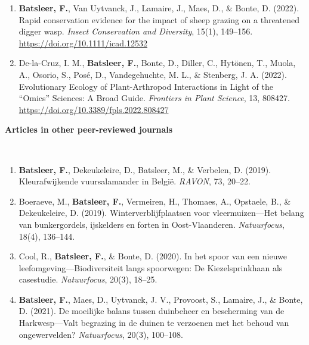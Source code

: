 \documentclass[10pt, twoside]{book} %
\begin{document}
\begin{enumerate}
		\item \textbf{Batsleer, F.}, Van Uytvanck, J., Lamaire, J., Maes, D., \& Bonte, D. (2022). Rapid conservation evidence for the impact of sheep grazing on a threatened digger wasp. \textit{Insect Conservation and Diversity}, 15(1), 149–156. \url{ https://doi.org/10.1111/icad.12532}
		
		\item De-la-Cruz, I. M., \textbf{Batsleer, F.}, Bonte, D., Diller, C., Hytönen, T., Muola, A., Osorio, S., Posé, D., Vandegehuchte, M. L., \& Stenberg, J. A. (2022). Evolutionary Ecology of Plant-Arthropod Interactions in Light of the ``Omics'' Sciences: A Broad Guide. \textit{Frontiers in Plant Science}, 13, 808427.\\ \url{https://doi.org/10.3389/fpls.2022.808427}
		
	\end{enumerate}

\vspace*{1cm}
\noindent \begin{large}\textbf{Articles in other peer-reviewed journals}\end{large}\\

\begin{enumerate}
	\item \textbf{Batsleer, F.}, Dekeukeleire, D., Batsleer, M., \& Verbelen, D. (2019). Kleur\-afwijkende vuursalamander in België. \textit{RAVON}, 73, 20–22.
	
	\item 	Boeraeve, M., \textbf{Batsleer, F.}, Vermeiren, H., Thomaes, A., Opstaele, B., \& Dekeukeleire, D. (2019). Winterverblijfplaatsen voor vleermuizen---Het belang van bunkergordels, ijskelders en forten in Oost-Vlaanderen. \textit{Natuurfocus}, 18(4), 136–144.
	
	\item Cool, R., \textbf{Batsleer, F.}, \& Bonte, D. (2020). In het spoor van een nieuwe leefomgeving---Biodiversiteit langs spoorwegen: De Kiezelsprinkhaan als case\-studie. \textit{Natuurfocus}, 20(3), 18–25.
	
	\item \textbf{Batsleer, F.}, Maes, D., Uytvanck, J. V., Provoost, S., Lamaire, J., \& Bonte, D. (2021). De moeilijke balans tussen duinbeheer en bescherming van de Harkwesp---Valt begrazing in de duinen te verzoenen met het behoud van ongewervelden? \textit{Natuurfocus}, 20(3), 100–108.
	

\vspace*{1cm}	
\end{enumerate}
\end{document}
